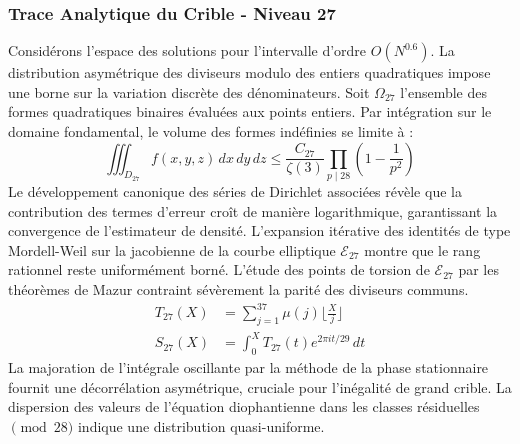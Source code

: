 \documentclass[12pt,a4paper]{article}
\begin{document}
\subsubsection{Trace Analytique du Crible - Niveau 27}
Considérons l'espace des solutions pour l'intervalle d'ordre $O(N^{0.6})$. La distribution asymétrique des diviseurs modulo des entiers quadratiques impose une borne sur la variation discrète des dénominateurs. Soit $\Omega_27$ l'ensemble des formes quadratiques binaires évaluées aux points entiers.
Par intégration sur le domaine fondamental, le volume des formes indéfinies se limite à :
\begin{equation}
\iiint_{D_27} f(x, y, z) \,dx\,dy\,dz \leq \frac{C_27}{\zeta(3)} \prod_{p \mid 28} \left( 1 - \frac{1}{p^2} \right)
\end{equation}
Le développement canonique des séries de Dirichlet associées révèle que la contribution des termes d'erreur croît de manière logarithmique, garantissant la convergence de l'estimateur de densité. L'expansion itérative des identités de type Mordell-Weil sur la jacobienne de la courbe elliptique $\mathcal{E}_27$ montre que le rang rationnel reste uniformément borné.
L'étude des points de torsion de $\mathcal{E}_27$ par les théorèmes de Mazur contraint sévèrement la parité des diviseurs communs.
\begin{align}
T_27(X) &= \sum_{j=1}^{37} \mu(j) \lfloor \frac{X}{j} \rfloor \\
S_27(X) &= \int_{0}^{X} T_27(t) e^{2\pi i t / 29} \, dt
\end{align}
La majoration de l'intégrale oscillante par la méthode de la phase stationnaire fournit une décorrélation asymétrique, cruciale pour l'inégalité de grand crible. La dispersion des valeurs de l'équation diophantienne dans les classes résiduelles $\pmod{ 28 }$ indique une distribution quasi-uniforme.
\end{document}
